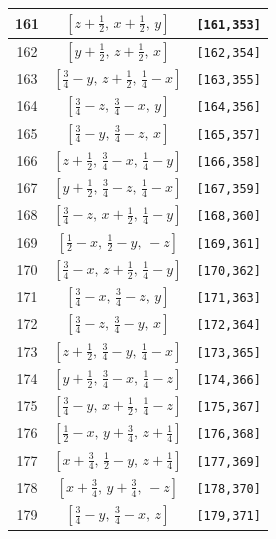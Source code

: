 \documentclass[fleqn,8pt]{jsarticle}
\begin{document}
\begin{longtable}{ccc}
161 & $\left[ z + \frac{1}{2},\, x + \frac{1}{2},\, y \right]$ & {\tt [161,353]} \\ \hline
162 & $\left[ y + \frac{1}{2},\, z + \frac{1}{2},\, x \right]$ & {\tt [162,354]} \\ \hline
163 & $\left[ \frac{3}{4} - y,\, z + \frac{1}{2},\, \frac{1}{4} - x \right]$ & {\tt [163,355]} \\ \hline
164 & $\left[ \frac{3}{4} - z,\, \frac{3}{4} - x,\, y \right]$ & {\tt [164,356]} \\ \hline
165 & $\left[ \frac{3}{4} - y,\, \frac{3}{4} - z,\, x \right]$ & {\tt [165,357]} \\ \hline
166 & $\left[ z + \frac{1}{2},\, \frac{3}{4} - x,\, \frac{1}{4} - y \right]$ & {\tt [166,358]} \\ \hline
167 & $\left[ y + \frac{1}{2},\, \frac{3}{4} - z,\, \frac{1}{4} - x \right]$ & {\tt [167,359]} \\ \hline
168 & $\left[ \frac{3}{4} - z,\, x + \frac{1}{2},\, \frac{1}{4} - y \right]$ & {\tt [168,360]} \\ \hline
169 & $\left[ \frac{1}{2} - x,\, \frac{1}{2} - y,\, - z \right]$ & {\tt [169,361]} \\ \hline
170 & $\left[ \frac{3}{4} - x,\, z + \frac{1}{2},\, \frac{1}{4} - y \right]$ & {\tt [170,362]} \\ \hline
171 & $\left[ \frac{3}{4} - x,\, \frac{3}{4} - z,\, y \right]$ & {\tt [171,363]} \\ \hline
172 & $\left[ \frac{3}{4} - z,\, \frac{3}{4} - y,\, x \right]$ & {\tt [172,364]} \\ \hline
173 & $\left[ z + \frac{1}{2},\, \frac{3}{4} - y,\, \frac{1}{4} - x \right]$ & {\tt [173,365]} \\ \hline
174 & $\left[ y + \frac{1}{2},\, \frac{3}{4} - x,\, \frac{1}{4} - z \right]$ & {\tt [174,366]} \\ \hline
175 & $\left[ \frac{3}{4} - y,\, x + \frac{1}{2},\, \frac{1}{4} - z \right]$ & {\tt [175,367]} \\ \hline
176 & $\left[ \frac{1}{2} - x,\, y + \frac{3}{4},\, z + \frac{1}{4} \right]$ & {\tt [176,368]} \\ \hline
177 & $\left[ x + \frac{3}{4},\, \frac{1}{2} - y,\, z + \frac{1}{4} \right]$ & {\tt [177,369]} \\ \hline
178 & $\left[ x + \frac{3}{4},\, y + \frac{3}{4},\, - z \right]$ & {\tt [178,370]} \\ \hline
179 & $\left[ \frac{3}{4} - y,\, \frac{3}{4} - x,\, z \right]$ & {\tt [179,371]} \\ \hline

\end{longtable}
\end{document}
